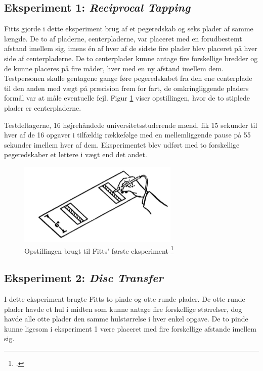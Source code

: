 \subsection*{Eksperiment 1: \textit{Reciprocal Tapping}}
Fitts gjorde i dette eksperiment brug af et pegeredskab og seks plader af samme længde. De to af pladerne, centerpladerne, var placeret med en forudbestemt afstand imellem sig, imens én af hver af de sidste fire plader blev placeret på hver side af centerpladerne. De to centerplader kunne antage fire forskellige bredder og de kunne placeres på fire måder, hver med en ny afstand imellem dem. Testpersonen skulle gentagene gange føre pegeredskabet fra den ene centerplade til den anden med vægt på præcision frem for fart, de omkringliggende pladers formål var at måle eventuelle fejl. Figur \ref{fig:FittsEx1} viser opstillingen, hvor de to stiplede plader er centerpladerne.

Testdeltagerne, 16 højrehåndede universitetsstuderende mænd, fik 15 sekunder til hver af de 16 opgaver i tilfældig rækkefølge med en mellemliggende pause på 55 sekunder imellem hver af dem. Eksperimentet blev udført med to forskellige pegeredskaber et lettere i vægt end det andet.

\begin{figure}[h]
\centering
\includegraphics{images/illustrations/fitt_ex1}
\caption{Opstillingen brugt til Fitts' første eksperiment \footcite{fitts1954}}
  \label{fig:FittsEx1}
\end{figure}

\subsection*{Eksperiment 2: \textit{Disc Transfer}}
I dette eksperiment brugte Fitts to pinde og otte runde plader. De otte runde plader havde et hul i midten som kunne antage fire forskellige størrelser, dog havde alle otte plader den samme hulstørrelse i hver enkel opgave. De to pinde kunne ligesom i eksperiment 1 være placeret med fire forskellige afstande imellem sig. 

